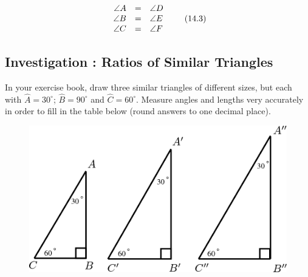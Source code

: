     \begin{equation}
    \begin{array}{ccc}\hfill \angle A& =& \angle D\hfill \\ \hfill \angle B& =& \angle E\hfill \\ \hfill \angle C& =& \angle F\hfill \end{array}\tag{14.3}
      \end{equation}
\label{m39405*secfhsst!!!underscore!!!id319}
            \subsection{  Investigation : Ratios of Similar Triangles }
            \nopagebreak
      \label{m39405*id78516}In your exercise book, draw three similar triangles of different sizes, but each with $\hat{A}={30}^{\circ }$; $\hat{B}={90}^{\circ }$ and $\hat{C}={60}^{\circ }$. Measure angles and lengths very accurately in order to fill in the table below (round answers to one decimal place).\par 
      \label{m39405*id78597}
    \setcounter{subfigure}{0}
	\begin{figure}[H] %
    \begin{center}
    \label{m39405*id78598!!!underscore!!!media}\label{m39405*id78598!!!underscore!!!printimage}\includegraphics{col11306.imgs/m39405_MG10C15_002.png} %
      \vspace{2pt}
    \vspace{.1in}
    \end{center}
 \end{figure}       
      \par 
